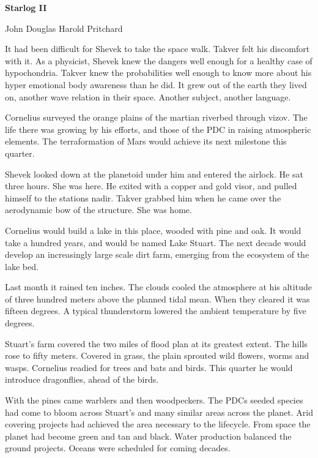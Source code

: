 


\centerline{\bf Starlog II}

\smallskip

\centerline{John Douglas Harold Pritchard}

\break



It had been difficult for Shevek to take the space walk.  Takver felt
his discomfort with it.  As a physicist, Shevek knew the dangers well
enough for a healthy case of hypochondria.  Takver knew the
probabilities well enough to know more about his hyper emotional body
awareness than he did.  It grew out of the earth they lived on,
another wave relation in their space.  Another subject, another
language.

\medskip

Cornelius surveyed the orange plains of the martian riverbed through
vizov.  The life there was growing by his efforts, and those of the
PDC in raising atmospheric elements.  The terraformation of Mars would
achieve its next milestone this quarter.

\medskip

Shevek looked down at the planetoid under him and entered the airlock.
He sat three hours.  She was here.  He exited with a copper and gold
visor, and pulled himself to the stations nadir.  Takver grabbed him
when he came over the aerodynamic bow of the structure.  She was home.

\medskip

Cornelius would build a lake in this place, wooded with pine and oak.
It would take a hundred years, and would be named Lake Stuart.  The
next decade would develop an increasingly large scale dirt farm,
emerging from the ecosystem of the lake bed.

Last month it rained ten inches.  The clouds cooled the atmosphere at
his altitude of three hundred meters above the planned tidal mean.
When they cleared it was fifteen degrees.  A typical thunderstorm
lowered the ambient temperature by five degrees.

Stuart's farm covered the two miles of flood plan at its greatest
extent.  The hills rose to fifty meters.  Covered in grass, the plain
sprouted wild flowers, worms and wasps.  Cornelius readied for trees
and bats and birds.  This quarter he would introduce dragonflies,
ahead of the birds.

With the pines came warblers and then woodpeckers.  The PDCs seeded
species had come to bloom across Stuart's and many similar areas
across the planet.  Arid covering projects had achieved the area
necessary to the lifecycle.  From space the planet had become green
and tan and black.  Water production balanced the ground projects.
Oceans were scheduled for coming decades.

\bye
